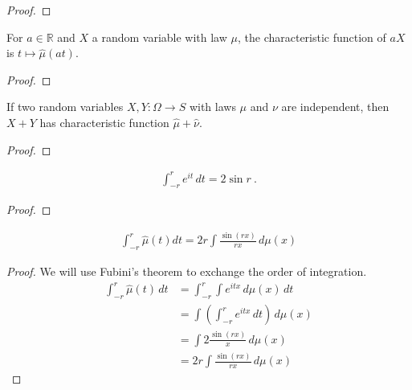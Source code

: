 \begin{proof}\leanok
\end{proof}


\begin{lemma}\label{lem:charFun_smul}
\leanok
{}
For $a \in \mathbb{R}$ and $X$ a random variable with law $\mu$, the characteristic function of $a X$ is $t \mapsto \hat{\mu}(at)$.
\end{lemma}

\begin{proof}\leanok
\end{proof}


\begin{lemma}\label{lem:charFun_add_of_indep}
\leanok
{}
If two random variables $X, Y : \Omega \to S$ with laws $\mu$ and $\nu$ are independent, then $X+Y$ has characteristic function $\hat{\mu} + \hat{\nu}$.
\end{lemma}

\begin{proof}\leanok
\end{proof}


\begin{lemma}\label{lem:integral_exp_I}
\leanok
{}
\begin{align*}
    \int_{-r}^r e^{i t} \, d t = 2 \sin r \: .
\end{align*}
\end{lemma}

\begin{proof}\leanok
\end{proof}


\begin{lemma}\label{lem:integral_charFun}
\leanok
{}
\begin{align*}
    \int_{-r}^r \hat{\mu}(t) dt = 2 r \int \frac{\sin(r x)}{r x} \, d\mu(x)
\end{align*}
\end{lemma}

\begin{proof}
\leanok
We will use Fubini's theorem to exchange the order of integration.
\begin{align*}
    \int_{-r}^r \hat{\mu}(t) \, dt
    &= \int_{-r}^r \int e^{i t x} \, d\mu(x) \, dt
    \\
    &= \int \left( \int_{-r}^r e^{i t x} \, dt \right) \, d\mu(x)
    \\
    &= \int 2 \frac{\sin(r x)}{x} \, d\mu(x)
    \\
    &= 2 r \int \frac{\sin(r x)}{r x} \, d\mu(x)
\end{align*}
\end{proof}


